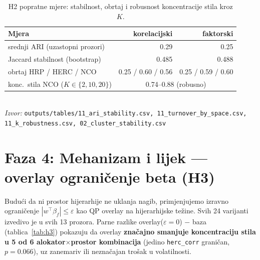 \documentclass[11pt]{article}
\newcommand{\izvor}[1]{{\footnotesize\textit{Izvor:} \texttt{#1}}}
\begin{document}
\begin{table}[!htbp]
  \centering
  \caption{H2 popratne mjere: stabilnost, obrtaj i robusnost koncentracije stila
  kroz $K$.}
  \label{tab:h2supp}
  \small
  \begin{tabular}{lrr}
    \toprule
    Mjera & korelacijski & faktorski \\
    \midrule
    srednji ARI (uzastopni prozori)        & 0.29 & 0.25 \\
    Jaccard stabilnost (bootstrap)         & 0.485 & 0.488 \\
    obrtaj HRP / HERC / NCO                & 0.25 / 0.60 / 0.56 & 0.25 / 0.59 / 0.60 \\
    konc.\ stila NCO ($K\in\{2,10,20\}$)   & \multicolumn{2}{c}{0.74--0.88 (robusno)} \\
    \bottomrule
  \end{tabular}\\[0.3em]
  \izvor{outputs/tables/11\_ari\_stability.csv, 11\_turnover\_by\_space.csv, 11\_k\_robustness.csv, 02\_cluster\_stability.csv}
\end{table}
\FloatBarrier

\section{Faza 4: Mehanizam i lijek --- overlay ograničenje beta (H3)}

Budući da ni prostor hijerarhije ne uklanja nagib, primjenjujemo izravno
ograničenje $|w^{\!\top}\beta_f|\le\varepsilon$ kao QP overlay na hijerarhijske
težine. Svih 24 varijanti izvedivo je u svih 13 prozora. Parne razlike
overlay($\varepsilon{=}0$) $-$ baza (tablica~\ref{tab:h3}) pokazuju da overlay
\textbf{značajno smanjuje koncentraciju stila u 5 od 6 alokator$\times$prostor
kombinacija} (jedino \texttt{herc\_corr} graničan, $p=0.066$), uz zanemariv ili
neznačajan trošak u volatilnosti.
\end{document}
